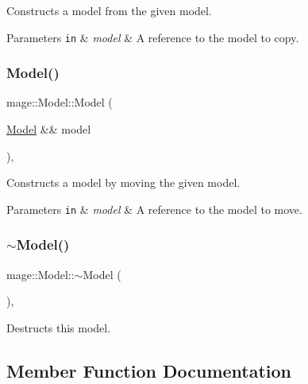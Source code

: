 Constructs a model from the given model.


\begin{DoxyParams}[1]{Parameters}
\mbox{\tt in}  & {\em model} & A reference to the model to copy. \\
\hline
\end{DoxyParams}
\hypertarget{classmage_1_1_model_aa3e0b4a875c8337c4ced47e390be09ef}{}\label{classmage_1_1_model_aa3e0b4a875c8337c4ced47e390be09ef} 
\subsubsection{\texorpdfstring{Model()}{Model()}\hspace{0.1cm}{\footnotesize\ttfamily [3/3]}}
{\footnotesize\ttfamily mage\+::\+Model\+::\+Model (\begin{DoxyParamCaption}\item[{\hyperlink{classmage_1_1_model}{Model} \&\&}]{model }\end{DoxyParamCaption})\hspace{0.3cm}{\ttfamily [default]}, {\ttfamily [noexcept]}}

Constructs a model by moving the given model.


\begin{DoxyParams}[1]{Parameters}
\mbox{\tt in}  & {\em model} & A reference to the model to move. \\
\hline
\end{DoxyParams}
\hypertarget{classmage_1_1_model_af9f45ed2dcf470f85bbfd144ca9857a7}{}\label{classmage_1_1_model_af9f45ed2dcf470f85bbfd144ca9857a7} 
\subsubsection{\texorpdfstring{$\sim$\+Model()}{~Model()}}
{\footnotesize\ttfamily mage\+::\+Model\+::$\sim$\+Model (\begin{DoxyParamCaption}{ }\end{DoxyParamCaption})\hspace{0.3cm}{\ttfamily [virtual]}, {\ttfamily [default]}}

Destructs this model. 

\subsection{Member Function Documentation}
\hypertarget{classmage_1_1_model_a0ee2a2b1bed4600f052af46ffcf12884}{}\label{classmage_1_1_model_a0ee2a2b1bed4600f052af46ffcf12884} 
